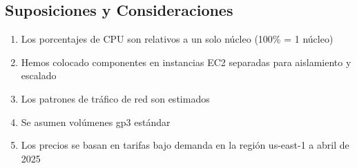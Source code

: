 \subsection{Suposiciones y Consideraciones}

\begin{enumerate}
    \item Los porcentajes de CPU son relativos a un solo núcleo (100\% = 1 núcleo)
    \item Hemos colocado componentes en instancias EC2 separadas para aislamiento y escalado
    \item Los patrones de tráfico de red son estimados
    \item Se asumen volúmenes gp3 estándar
    \item Los precios se basan en tarifas bajo demanda en la región us-east-1 a abril de 2025
\end{enumerate}